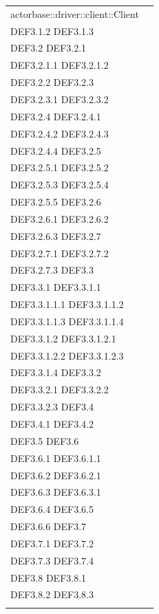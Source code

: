 \documentclass{scalatekids-article}
\begin{document}
\begin{longtable}[H]{|p{12cm}|p{5.5cm}|}
  actorbase::driver::client::Client & \multiLineCell[t]{DEF3.1 DEF3.1.1\\DEF3.1.2 DEF3.1.3\\DEF3.2 DEF3.2.1\\DEF3.2.1.1 DEF3.2.1.2\\DEF3.2.2 DEF3.2.3\\DEF3.2.3.1 DEF3.2.3.2\\DEF3.2.4 DEF3.2.4.1\\DEF3.2.4.2 DEF3.2.4.3\\DEF3.2.4.4 DEF3.2.5\\DEF3.2.5.1 DEF3.2.5.2\\DEF3.2.5.3 DEF3.2.5.4\\DEF3.2.5.5 DEF3.2.6\\DEF3.2.6.1 DEF3.2.6.2\\DEF3.2.6.3 DEF3.2.7\\DEF3.2.7.1 DEF3.2.7.2\\DEF3.2.7.3 DEF3.3\\DEF3.3.1 DEF3.3.1.1\\DEF3.3.1.1.1 DEF3.3.1.1.2\\DEF3.3.1.1.3 DEF3.3.1.1.4\\DEF3.3.1.2 DEF3.3.1.2.1\\DEF3.3.1.2.2 DEF3.3.1.2.3\\DEF3.3.1.4 DEF3.3.2\\DEF3.3.2.1 DEF3.3.2.2\\DEF3.3.2.3 DEF3.4\\DEF3.4.1 DEF3.4.2\\DEF3.5 DEF3.6\\DEF3.6.1 DEF3.6.1.1\\DEF3.6.2 DEF3.6.2.1\\DEF3.6.3 DEF3.6.3.1\\DEF3.6.4 DEF3.6.5\\DEF3.6.6 DEF3.7\\DEF3.7.1 DEF3.7.2\\DEF3.7.3 DEF3.7.4\\DEF3.8 DEF3.8.1\\DEF3.8.2 DEF3.8.3\\}\\
  \hline

\end{longtable}
\end{document}
